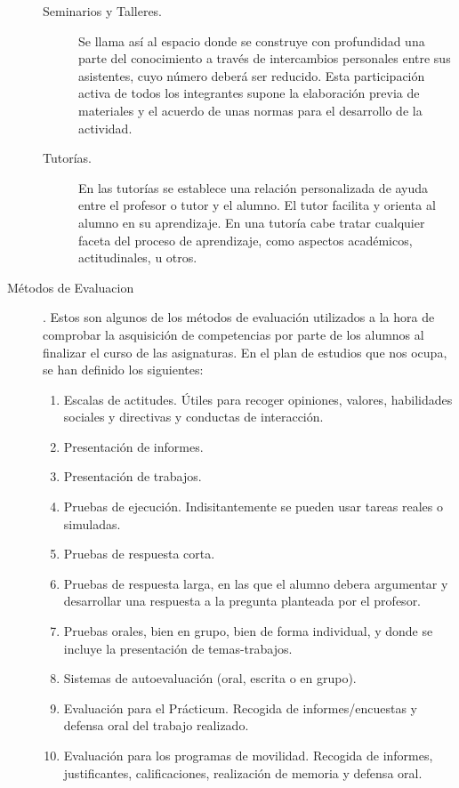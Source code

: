 \begin{description}
\begin{description}
			\item [Seminarios y Talleres.] Se llama así al espacio donde se construye con profundidad una parte del conocimiento a través de intercambios personales entre sus asistentes, cuyo número deberá ser reducido. Esta participación activa de todos los integrantes supone la elaboración previa de materiales y el acuerdo de unas normas para el desarrollo de la actividad. 
			\item [Tutorías.] En las tutorías se establece una relación personalizada de ayuda entre el profesor o tutor y el alumno. El tutor facilita y orienta al alumno en su aprendizaje. En una tutoría cabe tratar cualquier faceta del proceso de aprendizaje, como aspectos académicos, actitudinales, u otros.
		\end{description}
		 
		 
  
		\item [Métodos de Evaluacion]. Estos son algunos de los métodos de evaluación utilizados a la hora de comprobar la asquisición de competencias por parte de los alumnos al finalizar el curso de las asignaturas. En el plan de estudios que nos ocupa, se han definido los siguientes:
  
		\begin{enumerate}
			\item Escalas de actitudes. Útiles para recoger opiniones, valores, habilidades sociales y directivas y conductas de interacción.
			\item Presentación de informes.
			\item Presentación de trabajos. 
			\item Pruebas de ejecución. Indisitantemente se pueden usar tareas reales o simuladas.
			\item Pruebas de respuesta corta. 
			\item Pruebas de respuesta larga, en las que el alumno debera argumentar y desarrollar una respuesta a la pregunta planteada por el profesor.
			\item Pruebas orales, bien en grupo, bien de forma individual, y donde se incluye la presentación de temas-trabajos.
			\item Sistemas de autoevaluación (oral, escrita o en grupo).
			\item Evaluación para el Prácticum. Recogida de informes/encuestas y defensa oral del trabajo realizado.
			\item Evaluación para los programas de movilidad. Recogida de informes, justificantes, calificaciones, realización de memoria y defensa oral.
		\end{enumerate}
		 
		 
  

\end{description}
